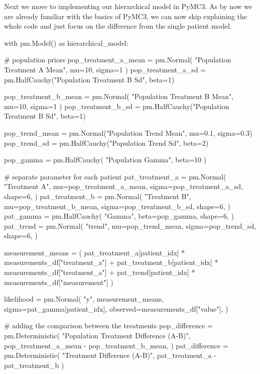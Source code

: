 \documentclass[12pt,a4paper,leqno]{report}
\theoremstyle{plain}
\theoremstyle{definition}
\theoremstyle{remark}
\begin{document}
Next we move to implementing our hierarchical model in PyMC3. As by now we are already
familiar with the basics of PyMC3, we can now skip explaining the whole code and just focus
on the difference from the single patient model.

\bigskip
\begin{pyverbatim}

with pm.Model() as hierarchical_model:

    # population priors
    pop_treatment_a_mean = pm.Normal(
        "Population Treatment A Mean", mu=10, sigma=1
    )
    pop_treatment_a_sd = pm.HalfCauchy("Population Treatment B Sd", beta=1)

    pop_treatment_b_mean = pm.Normal(
        "Population Treatment B Mean", mu=10, sigma=1
    )
    pop_treatment_b_sd = pm.HalfCauchy("Population Treatment B Sd", beta=1)

    pop_trend_mean = pm.Normal("Population Trend Mean", mu=0.1, sigma=0.3)
    pop_trend_sd = pm.HalfCauchy("Population Trend Sd", beta=2)

    pop_gamma = pm.HalfCauchy(
        "Population Gamma", beta=10
    )

    # separate parameter for each patient
    pat_treatment_a = pm.Normal(
        "Treatment A",
        mu=pop_treatment_a_mean,
        sigma=pop_treatment_a_sd,
        shape=6,
    )
    pat_treatment_b = pm.Normal(
        "Treatment B",
        mu=pop_treatment_b_mean,
        sigma=pop_treatment_b_sd,
        shape=6,
    )
    pat_gamma = pm.HalfCauchy(
        "Gamma", beta=pop_gamma, shape=6,
    )
    pat_trend = pm.Normal(
        "trend",
        mu=pop_trend_mean,
        sigma=pop_trend_sd,
        shape=6,
    )

    measurement_means = (
        pat_treatment_a[patient_idx] * measurements_df["treatment_a"]
        + pat_treatment_b[patient_idx] * measurements_df["treatment_a"]
        + pat_trend[patient_idx] * measurements_df["measurement"]
    )

    likelihood = pm.Normal(
        "y",
        measurement_means,
        sigma=pat_gamma[patient_idx],
        observed=measurements_df["value"],
    )

    # adding the comparison between the treatments
    pop_difference = pm.Deterministic(
        "Population Treatment Difference (A-B)",
        pop_treatment_a_mean - pop_treatment_b_mean,
    )
    pat_difference = pm.Deterministic(
        "Treatment Difference (A-B)", pat_treatment_a - pat_treatment_b
    )


\end{pyverbatim}
\end{document}
